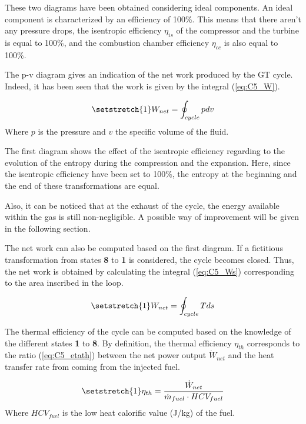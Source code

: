 These two diagrams have been obtained considering ideal components. An ideal component is characterized by an efficiency of 100\%. This means that there aren't any pressure drops, the isentropic efficiency $\eta_{is}$ of the compressor and the turbine is equal to 100\%, and the combustion chamber efficiency $\eta_{cc}$ is also equal to 100\%.

The p-v diagram gives an indication of the net work produced by the GT cycle. Indeed, it has been seen that the work is given by the integral (\ref{eq:C5_W}).

\begin{equation}
    \setstretch{1}
    W_{net} = \oint_{cycle}pdv\label{eq:C5_W}
\end{equation}
Where $p$ is the pressure and $v$ the specific volume of the fluid.

The first diagram shows the effect of the isentropic efficiency regarding to the evolution of the entropy during the compression and the expansion. Here, since the isentropic efficiency have been set to 100\%, the entropy at the beginning and the end of these transformations are equal.

Also, it can be noticed that at the exhaust of the cycle, the energy available within the gas is still non-negligible. A possible way of improvement will be given in the following section.

The net work can also be computed based on the first diagram. If a fictitious transformation from states \textbf{8} to \textbf{1} is considered, the cycle becomes closed. Thus, the net work is obtained by calculating the integral (\ref{eq:C5_Ws}) corresponding to the area inscribed in the loop.

\begin{equation}
    \setstretch{1}
    W_{net} = \oint_{cycle}Tds\label{eq:C5_Ws}
\end{equation}

The thermal efficiency of the cycle can be computed based on the knowledge of the different states \textbf{1} to \textbf{8}. By definition, the thermal efficiency $\eta_{th}$ corresponds to the ratio (\ref{eq:C5_etath}) between the net power output $\dot{W}_{net}$ and the heat transfer rate from coming from the injected fuel.

\begin{equation}
    \setstretch{1}
    \eta_{th} = \frac{\dot{W}_{net}}{\dot{m}_{fuel}\cdot HCV_{fuel}} \label{eq:C5_etath}
\end{equation}
Where $HCV_{fuel}$ is the low heat calorific value (J/kg) of the fuel.

